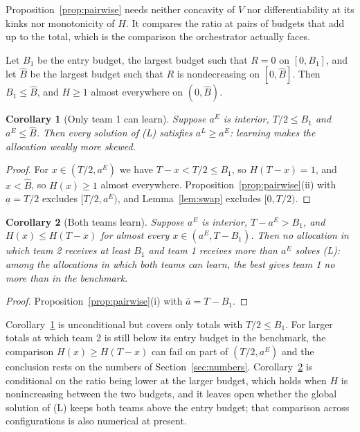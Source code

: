 \documentclass[11pt]{article}
\newtheorem{corollary}{Corollary}
\theoremstyle{definition}
\begin{document}
Proposition~\ref{prop:pairwise} needs neither concavity of $V$ nor differentiability at its kinks nor monotonicity of $H$. It compares the ratio at pairs of budgets that add up to the total, which is the comparison the orchestrator actually faces.

Let $B_1$ be the entry budget, the largest budget such that $R=0$ on $[0,B_1]$, and let $\hat B$ be the largest budget such that $R$ is nondecreasing on $[0,\hat B]$. Then $B_1\le\hat B$, and $H\ge1$ almost everywhere on $(0,\hat B)$.

\begin{corollary}[Only team 1 can learn]\label{cor:one}
Suppose $a^E$ is interior, $T/2\le B_1$ and $a^E\le\hat B$. Then every solution of (L) satisfies $a^L\ge a^E$: learning makes the allocation weakly more skewed.
\end{corollary}

\begin{proof}
For $x\in(T/2,a^E)$ we have $T-x<T/2\le B_1$, so $H(T-x)=1$, and $x<\hat B$, so $H(x)\ge1$ almost everywhere. Proposition~\ref{prop:pairwise}(ii) with $\underline a=T/2$ excludes $[T/2,a^E)$, and Lemma~\ref{lem:swap} excludes $[0,T/2)$.
\end{proof}

\begin{corollary}[Both teams learn]\label{cor:both}
Suppose $a^E$ is interior, $T-a^E>B_1$, and $H(x)\le H(T-x)$ for almost every $x\in(a^E,T-B_1)$. Then no allocation in which team 2 receives at least $B_1$ and team 1 receives more than $a^E$ solves (L): among the allocations in which both teams can learn, the best gives team 1 no more than in the benchmark.
\end{corollary}

\begin{proof}
Proposition~\ref{prop:pairwise}(i) with $\bar a=T-B_1$.
\end{proof}

Corollary~\ref{cor:one} is unconditional but covers only totals with $T/2\le B_1$. For larger totals at which team 2 is still below its entry budget in the benchmark, the comparison $H(x)\ge H(T-x)$ can fail on part of $(T/2,a^E)$ and the conclusion rests on the numbers of Section~\ref{sec:numbers}. Corollary~\ref{cor:both} is conditional on the ratio being lower at the larger budget, which holds when $H$ is nonincreasing between the two budgets, and it leaves open whether the global solution of (L) keeps both teams above the entry budget; that comparison across configurations is also numerical at present.
\end{document}
